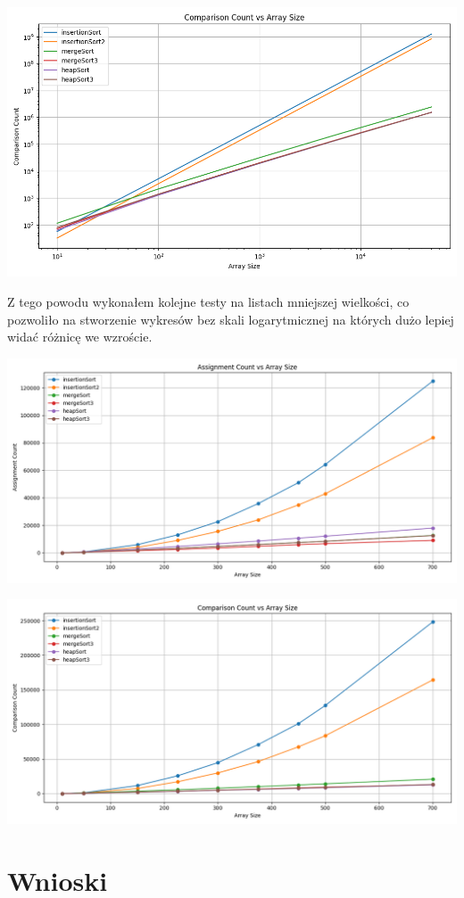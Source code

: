 \documentclass{article}
\begin{document}
\includegraphics[width=0.95\linewidth]{Comparison plot.png}


Z tego powodu wykonałem kolejne testy na listach mniejszej wielkości, co pozwoliło na stworzenie wykresów bez skali logarytmicznej na których dużo lepiej widać różnicę we wzroście.

\includegraphics[width=0.95\linewidth]{Assignment plot small.png}

\includegraphics[width=0.95\linewidth]{Comparison plot small.png}

\section{Wnioski}
\end{document}
